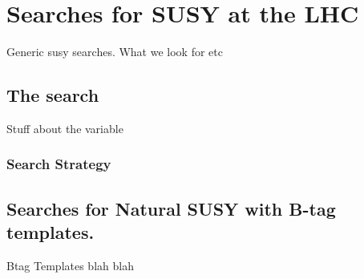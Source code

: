 \chapter{Searches for SUSY at the LHC}
\label{chap:SUSYsearches}

Generic susy searches. What we look for etc

\section{The \alphat search}
\label{sec:alphatintroduction}

Stuff about the \alphat variable


\subsection{Search Strategy}
\label{subsec:searchstrategy}

\section{Searches for Natural SUSY with B-tag templates.}
\label{sec:templatemethod}

Btag Templates blah blah

